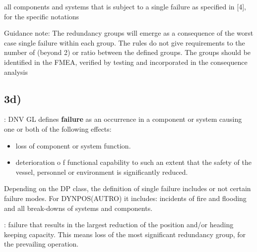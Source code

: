 
all components and systems that is subject to a single failure as specified in [4], for the specific notations

Guidance note:
The redundancy groups will emerge as a consequence of the worst case single failure within each
group. The rules do not give requirements to the number of (beyond 2) or ratio between the
defined groups. The groups should be identified in the FMEA, verified by testing and incorporated in
the consequence analysis

    \begin{comment}
    \cite{RecommendedPractices_DP_DNVGL} page 26.
    
    There are three key elements in any redundancy concept:
    1) performance
    2) protection
    3) detection
    
    THEN THEY EXPLAIN EACH. SEE IF WE NEED TO INCLUDE THIS
    \end{comment}

\subsection*{3d)} \label{Sec:3d}

: 
DNV GL defines \textbf{failure} as an occurrence in a component or system causing one or both of the following effects:
\begin{itemize}
    \item loss of component or system function.
    \item deterioration o f functional capability to such an extent that the safety of the vessel, personnel or environment is significantly reduced.
\end{itemize}

Depending on the DP class, the definition of single failure includes or not certain failure modes. For DYNPOS(AUTRO) it includes: incidents of fire and flooding and all break-downs of systems and components.

: failure that results in the largest reduction of the position and/or heading keeping capacity. This means loss of the most significant redundancy group, for the prevailing operation.

